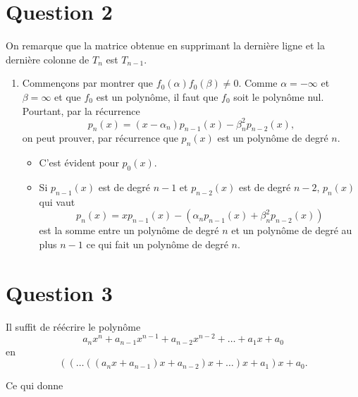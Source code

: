 \documentclass{article}
\begin{document}
\section*{Question 2}
On remarque que la matrice obtenue en supprimant
la dernière ligne et la dernière colonne de $T_n$ est $T_{n-1}$.
\begin{enumerate}
  \item Commençons par montrer que $f_0(\alpha)f_0(\beta) \neq 0$.
    Comme $\alpha = -\infty$ et $\beta = \infty$ et que $f_0$ est un polynôme,
    il faut que $f_0$ soit le polynôme nul.
    Pourtant, par la récurrence
    \[ p_n(x) = (x - \alpha_n)p_{n-1}(x) - \beta_n^2p_{n-2}(x), \]
    on peut prouver, par récurrence que $p_n(x)$ est un polynôme de degré
    $n$.
    \begin{itemize}
      \item C'est évident pour $p_0(x)$.
      \item Si $p_{n-1}(x)$ est de degré $n-1$ et $p_{n-2}(x)$ est de degré
        $n-2$, $p_n(x)$ qui vaut
        \[ p_n(x) = xp_{n-1}(x) - (\alpha_np_{n-1}(x) + \beta_n^2p_{n-2}(x)) \]
        est la somme entre un polynôme de degré $n$ et un polynôme de
        degré au plus $n-1$ ce qui fait un polynôme de degré $n$.
    \end{itemize}
\end{enumerate}

\section*{Question 3}
Il suffit de réécrire le polynôme
\[ a_nx^n + a_{n-1}x^{n-1} + a_{n-2}x^{n-2} + \ldots + a_1x + a_0 \]
en
\[ ((\ldots((a_nx + a_{n-1})x + a_{n-2})x + \ldots)x + a_1)x + a_0. \]

Ce qui donne

\end{document}
